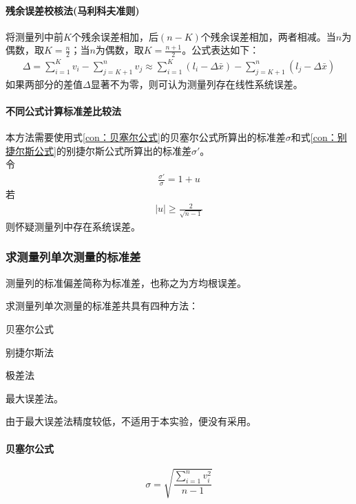 \documentclass{ctexart}
\begin{document}
				\paragraph{残余误差校核法(马利科夫准则)}
					将测量列中前$K$个残余误差相加，后$(n-K)$个残余误差相加，两者相减。当$n$为偶数，取$K=\frac{n}{2}$；当$n$为偶数，取$K=\frac{n+1}{2}$。公式表达如下：
					\begin{gather*}
						\Delta=\sum \limits_{i=1}^K v_i-\sum \limits_{j=K+1}^n v_j  \approx \sum \limits_{i=1}^{K} (l_{i}-\Delta \bar{x})-\sum \limits_{j=K+1}^{n}(l_{j}-\Delta \bar{x})
					\end{gather*}
					如果两部分的差值$\Delta$显著不为零，则可认为测量列存在线性系统误差。
				\paragraph{不同公式计算标准差比较法}
					本方法需要使用式\ref{con：贝塞尔公式}的贝塞尔公式所算出的标准差$\sigma$和式\ref{con：别捷尔斯公式}的别捷尔斯公式所算出的标准差$\sigma'$。\\
					令
					\begin{gather*}
						\frac{\sigma'}{\sigma}=1+u
					\end{gather*}
					若
					\begin{gather*}
						\lvert u \rvert \geq \frac{2}{\sqrt{n-1}}
					\end{gather*}
					则怀疑测量列中存在系统误差。
			\subsubsection{求测量列单次测量的标准差}
				测量列的标准偏差简称为标准差，也称之为方均根误差。\par
				求测量列单次测量的标准差共具有四种方法：
				\begin{inparaenum}
					\item 贝塞尔公式
					\item 别捷尔斯法
					\item 极差法
					\item 最大误差法。
				\end{inparaenum}\par
				由于最大误差法精度较低，不适用于本实验，便没有采用。
				\paragraph{贝塞尔公式}
					\begin{equation}
						\sigma=\sqrt{\frac{\sum \limits_{i=1}^n v_i^2}{n-1}}
						\label{con：贝塞尔公式}
					\end{equation}
\end{document}
